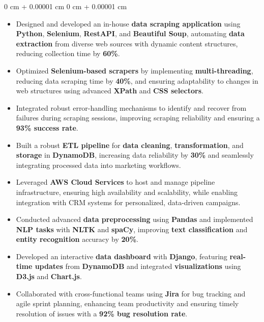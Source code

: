 \documentclass[10pt, letterpaper]{article}
\newenvironment{highlights}{
    \begin{itemize}[
        topsep=0.10 cm,
        parsep=0.10 cm,
        partopsep=0pt,
        itemsep=0pt,
        leftmargin=0 cm + 10pt
    ]
}{
    \end{itemize}
} %
\newenvironment{onecolentry}{
    \begin{adjustwidth}{
        0 cm + 0.00001 cm
    }{
        0 cm + 0.00001 cm
    }
}{
    \end{adjustwidth}
} %
\begin{document}
\begin{onecolentry}
	\begin{highlights}
		\item Designed and developed an in-house \textbf{data scraping application} using \textbf{Python}, \textbf{Selenium}, \textbf{RestAPI}, and \textbf{Beautiful Soup}, automating \textbf{data extraction} from diverse web sources with dynamic content structures, reducing collection time by \textbf{60\%}.
		\item Optimized \textbf{Selenium-based scrapers} by implementing \textbf{multi-threading}, reducing data scraping time by \textbf{40\%}, and ensuring adaptability to changes in web structures using advanced \textbf{XPath} and \textbf{CSS selectors}.
		\item Integrated robust error-handling mechanisms to identify and recover from failures during scraping sessions, improving scraping reliability and ensuring a \textbf{93\% success rate}.
		\item Built a robust \textbf{ETL pipeline} for \textbf{data cleaning}, \textbf{transformation}, and \textbf{storage} in \textbf{DynamoDB}, increasing data reliability by \textbf{30\%} and seamlessly integrating processed data into marketing workflows.
		\item Leveraged \textbf{AWS Cloud Services} to host and manage pipeline infrastructure, ensuring high availability and scalability, while enabling integration with CRM systems for personalized, data-driven campaigns.
		\item Conducted advanced \textbf{data preprocessing} using \textbf{Pandas} and implemented \textbf{NLP tasks} with \textbf{NLTK} and \textbf{spaCy}, improving \textbf{text classification} and \textbf{entity recognition} accuracy by \textbf{20\%}.
		\item Developed an interactive \textbf{data dashboard} with \textbf{Django}, featuring \textbf{real-time updates} from \textbf{DynamoDB} and integrated \textbf{visualizations} using \textbf{D3.js} and \textbf{Chart.js}.
		\item Collaborated with cross-functional teams using \textbf{Jira} for bug tracking and agile sprint planning, enhancing team productivity and ensuring timely resolution of issues with a \textbf{92\% bug resolution rate}.
	\end{highlights}
\end{onecolentry}
\end{document}
